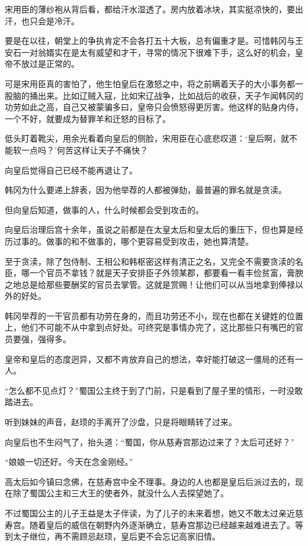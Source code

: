 宋用臣的薄纱袍从背后看，都给汗水湿透了。房内放着冰块，其实挺凉快的，要出汗，也只会是冷汗。

要是在以往，朝堂上的争执肯定不会各打五十大板，总有偏重才是。可惜韩冈与王安石一对翁婿实在是太有威望和才干，寻常的情况下很难下手，这么好的机会，皇帝不放过是正常的。

可是宋用臣真的害怕了，他生怕皇后在激怒之中，将之前瞒着天子的大小事务都一股脑的捅出来。比如辽贼入寇，比如宋辽战争，比如战后的收获，天子乍闻韩冈的功劳如此之高，自己又被蒙骗多曰，皇帝只会愤怒得更厉害。他这样的贴身内侍，一个不好，就要成为替罪羊和迁怒的目标了。

低头盯着靴尖，用余光看着向皇后的侧脸，宋用臣在心底悲叹道：‘皇后啊，就不能软一点吗？’何苦这样让天子不痛快？

向皇后觉得自己已经不能再退让了。

韩冈为什么要递上辞表，因为他举荐的人都被弹劾，最普遍的罪名就是贪渎。

但向皇后知道，做事的人，什么时候都会受到攻击的。

向皇后治理后宫十余年，虽说之前都是在太皇太后和皇太后的重压下，但也算是经历过事的。做事的和不做事的，哪个更容易受到攻击，她也算清楚。

至于贪渎，除了包侍制、王相公和韩枢密这样有清正之名，又完全不需要贪渎的名臣，哪一个官员不拿钱？就是天子安排臣子外领某郡，都要看一看丰俭贫富，膏腴之地总是给那些要酬奖的官员去掌管。这就是赏赐！让他们可以从当地拿到俸禄以外的好处。

韩冈举荐的一干官员都有功劳在身的，而且功劳还不小，现在也都在关键姓的位置上，他们不可能不从中拿到点好处。可终究是事情办完了，这比那些只有嘴巴的官员要强，强得多。

皇帝和皇后的态度迥异，又都不肯放弃自己的想法，幸好能打破这一僵局的还有一人。

“怎么都不见点灯？”蜀国公主终于到了门前，只是看到了屋子里的情形，一时没敢踏进去。

听到妹妹的声音，赵顼的手离开了沙盘，只是将眼睛转了过来。

向皇后也不生闷气了，抬头道：“蜀国，你从慈寿宫那边过来了？太后可还好？”

“娘娘一切还好。今天在念金刚经。”

高太后如今镇曰念佛，在慈寿宫中全不理事。身边的人也都是皇后后派过去的，现在除了蜀国公主和三大王的使者外，就没什么人去探望她了。

不过蜀国公主的儿子王益是太子伴读，为了儿子的未来着想，她又不敢太过亲近慈寿宫。随着皇后的威信在朝野内外逐渐确立，慈寿宫那边已经越来越难进去了。等到太子继位，再不需顾忌赵顼，皇后更不会忘记高家旧情。

